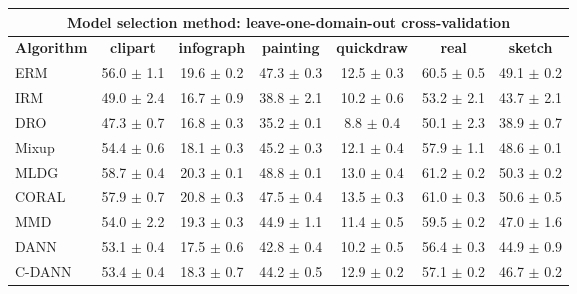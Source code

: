 \documentclass{article}
\begin{document}
\begin{center}
\begin{tabular}{lcccccc}
\toprule
\multicolumn{7}{c}{\textbf{Model selection method: leave-one-domain-out cross-validation}} \\
\midrule
\textbf{Algorithm}    & \textbf{clipart} & \textbf{infograph} & \textbf{painting} & \textbf{quickdraw} & \textbf{real} & \textbf{sketch}     \\
\midrule
ERM                 &      56.0 $\pm$ 1.1     &       19.6 $\pm$ 0.2  &          47.3 $\pm$ 0.3    &        12.5 $\pm$ 0.3      &      60.5 $\pm$ 0.5     &       49.1 $\pm$ 0.2 \\            
IRM                 &      49.0 $\pm$ 2.4     &       16.7 $\pm$ 0.9  &          38.8 $\pm$ 2.1    &        10.2 $\pm$ 0.6      &      53.2 $\pm$ 2.1     &       43.7 $\pm$ 2.1 \\            
DRO           &      47.3 $\pm$ 0.7     &       16.8 $\pm$ 0.3  &          35.2 $\pm$ 0.1    &        8.8 $\pm$ 0.4       &      50.1 $\pm$ 2.3     &       38.9 $\pm$ 0.7 \\            
Mixup               &      54.4 $\pm$ 0.6     &       18.1 $\pm$ 0.3  &          45.2 $\pm$ 0.3    &        12.1 $\pm$ 0.4      &      57.9 $\pm$ 1.1     &       48.6 $\pm$ 0.1 \\            
MLDG                &      58.7 $\pm$ 0.4     &       20.3 $\pm$ 0.1  &          48.8 $\pm$ 0.1    &        13.0 $\pm$ 0.4      &      61.2 $\pm$ 0.2     &       50.3 $\pm$ 0.2 \\            
CORAL               &      57.9 $\pm$ 0.7     &       20.8 $\pm$ 0.3  &          47.5 $\pm$ 0.4    &        13.5 $\pm$ 0.3      &      61.0 $\pm$ 0.3     &       50.6 $\pm$ 0.5 \\            
MMD                 &      54.0 $\pm$ 2.2     &       19.3 $\pm$ 0.3  &          44.9 $\pm$ 1.1    &        11.4 $\pm$ 0.5      &      59.5 $\pm$ 0.2     &       47.0 $\pm$ 1.6 \\            
DANN                 &      53.1 $\pm$ 0.4     &       17.5 $\pm$ 0.6  &          42.8 $\pm$ 0.4    &        10.2 $\pm$ 0.5      &      56.4 $\pm$ 0.3     &       44.9 $\pm$ 0.9 \\            
C-DANN             &      53.4 $\pm$ 0.4     &       18.3 $\pm$ 0.7  &          44.2 $\pm$ 0.5    &        12.9 $\pm$ 0.2      &      57.1 $\pm$ 0.2     &       46.7 $\pm$ 0.2 \\            
\bottomrule
\end{tabular}
\end{center}
\end{document}
